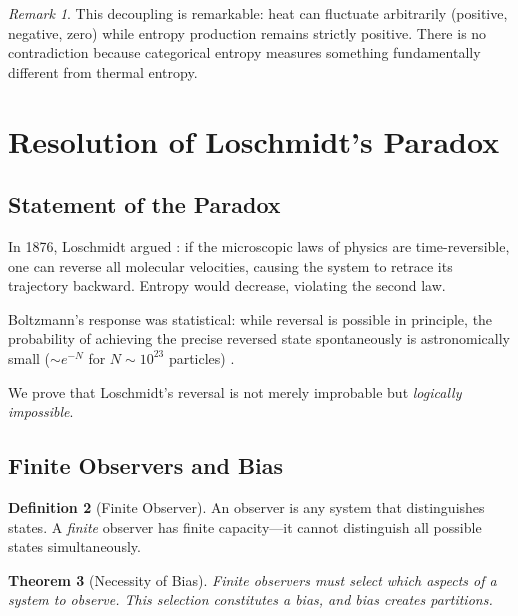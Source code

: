 \documentclass[twocolumn,10pt,a4paper]{article}
\newtheorem{theorem}{Theorem}[section]
\theoremstyle{definition}
\newtheorem{definition}[theorem]{Definition}
\theoremstyle{remark}
\newtheorem{remark}[theorem]{Remark}
\begin{document}
\begin{remark}
This decoupling is remarkable: heat can fluctuate arbitrarily (positive, negative, zero) while entropy production remains strictly positive. There is no contradiction because categorical entropy measures something fundamentally different from thermal entropy.
\end{remark}

\section{Resolution of Loschmidt's Paradox}
\label{sec:loschmidt}

\subsection{Statement of the Paradox}

In 1876, Loschmidt argued \cite{loschmidt1876}: if the microscopic laws of physics are time-reversible, one can reverse all molecular velocities, causing the system to retrace its trajectory backward. Entropy would decrease, violating the second law.

Boltzmann's response was statistical: while reversal is possible in principle, the probability of achieving the precise reversed state spontaneously is astronomically small ($\sim e^{-N}$ for $N \sim 10^{23}$ particles) \cite{boltzmann1877}.

We prove that Loschmidt's reversal is not merely improbable but \emph{logically impossible}.

\subsection{Finite Observers and Bias}

\begin{definition}[Finite Observer]
An observer is any system that distinguishes states. A \emph{finite} observer has finite capacity---it cannot distinguish all possible states simultaneously.
\end{definition}

\begin{theorem}[Necessity of Bias]
Finite observers must select which aspects of a system to observe. This selection constitutes a \emph{bias}, and bias creates partitions.
\end{theorem}
\end{document}
